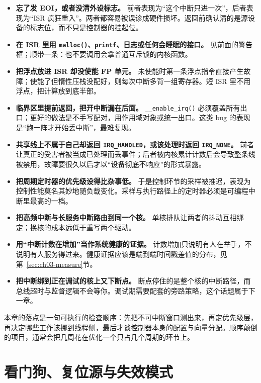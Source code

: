 \documentclass[12pt,a4paper,fontset=fandol]{ctexbook}
\newcommand{\Fn}[1]{\texttt{#1()}}
\newcommand{\Tp}[1]{\texttt{#1}}
\begin{document}
\begin{itemize}
\item \textbf{忘了发 EOI，或者没清外设标志。} 前者表现为``这个中断只进一次''，后者表现为``ISR 疯狂重入''。两者都容易被误诊成硬件损坏。返回前确认清的是源设备的标志位，而不只是控制器的挂起位。
\item \textbf{在 ISR 里用 \Fn{malloc}、\Tp{printf}、日志或任何会睡眠的接口。} 见前面的警告框；顺带一条：也不要调用会拿普通互斥锁的内核函数。
\item \textbf{把浮点放进 ISR 却没使能 FP 单元。} 未使能时第一条浮点指令直接产生故障；使能了但惰性压栈没配好，则每次中断多背一组寄存器。短 ISR 里不用浮点，把计算放到底半部。
\item \textbf{临界区里提前返回，把开中断漏在后面。} \Fn{\_\_enable\_irq} 必须覆盖所有出口；更好的做法是不手写配对，用作用域对象或统一出口。这类 bug 的表现是``跑一阵才开始丢中断''，最难复现。
\item \textbf{共享线上不属于自己却返回 \Tp{IRQ\_HANDLED}，或该处理时返回 \Tp{IRQ\_NONE}。} 前者让真正的受害者被当成已处理而丢事件；后者被内核累计计数后会导致整条线被禁用，故障要很久以后才以``设备彻底不响应''的形式暴露。
\item \textbf{把周期定时器的优先级设得比杂事低。} 于是控制环节的采样被推迟，表现为控制性能莫名其妙地随负载变化。采样与执行路径上的定时器必须是可编程中断里最高的一档。
\item \textbf{把高频中断与长服务中断路由到同一个核。} 单核排队让两者的抖动互相绑定；换核的成本远低于重写两个驱动。
\item \textbf{用``中断计数在增加''当作系统健康的证据。} 计数增加只说明有人在举手，不说明有人服务得过来。健康证据应该是端到端时间戳差值的分布，见第~\ref{sec:ch03-measure}节。
\item \textbf{把中断绑到正在调试的核上又下断点。} 断点停住的是整个核的中断路径，而总线超时与监督逻辑不会等你。调试期需要配套的旁路策略，这个话题属于下一章。
\end{itemize}

本章的落点是一句可执行的检查顺序：先把不可中断窗口测出来，再定优先级层，再决定哪些工作该挪到线程侧，最后才谈控制器本身的配置与向量分配。顺序颠倒的项目，通常会把几周花在优化一个只占几个周期的环节上。

\chapter{看门狗、复位源与失效模式}
\label{ch:ch04-watchdog-failsafe}
\end{document}
